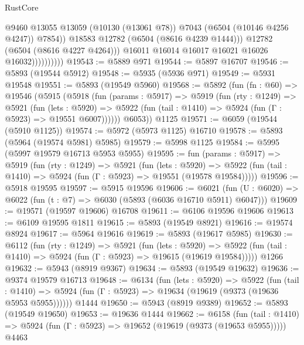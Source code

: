\begin{lexlean}{RustCore}
\begin{coremodule}
                                @9460
                                @13055
                                @13059
                                (@10130 (@13061 @78))
                                @7043
                                (@6504 (@10146 @4256 @4247))
                                @7854))
                            @18583
                            @12782
                            (@6504 (@8616 @4239 @1444)))
                          @12782
                          (@6504 (@8616 @4227 @4264)))
                        @16011
                        @16014
                        @16017
                        @16021
                        @16026
                        @16032))))))))))
@19543 := @5889 @971
@19544 := @5897 @16707
@19546 := @5893 (@19544 @5912)
@19548 := @5935 (@5936 @971)
@19549 := @5931 @19548
@19551 := @5893 (@19549 @5960)
@19568 := @5892
    (fun (fn : @60) =>
    @19546
      (@5915
        (@5918
          (fun (params : @5917) =>
          @5919
            (fun (rty : @1249) =>
            @5921
              (fun (lets : @5920) =>
              @5922 (fun (tail : @1410) => @5924 (fun (Γ : @5923) => @19551 @6007))))))
        @6053))
    @1125
@19571 := @6059 (@19544 (@5910 @1125))
@19574 := @5972 (@5973 @1125) @16710
@19578 := @5893 (@5964 (@19574 @5981) @5985)
@19579 := @5998 @1125
@19584 := @5995 (@5997 @19579 @16713 @5953 @5955)
@19595 := fun (params : @5917) =>
  @5919
    (fun (rty : @1249) =>
    @5921
      (fun (lets : @5920) =>
      @5922 (fun (tail : @1410) => @5924 (fun (Γ : @5923) => @19551 (@19578 @19584)))))
@19596 := @5918 @19595
@19597 := @5915 @19596
@19606 := @6021
    (fun (U : @6020) => @6022 (fun (t : @7) => @6030 (@5893 (@6036 @16710 @5911) @6047)))
@19609 := @19571 (@19597 @19606) @16708
@19611 := @6106 @19596 @19606
@19613 := @6109 @19595 @1811
@19615 := @5893 (@19549 @8921)
@19616 := @19574 @8924
@19617 := @5964 @19616
@19619 := @5893 (@19617 @5985)
@19630 := @6112
    (fun (rty : @1249) =>
    @5921
      (fun (lets : @5920) =>
      @5922 (fun (tail : @1410) => @5924 (fun (Γ : @5923) => @19615 (@19619 @19584)))))
    @1266
@19632 := @5943 (@8919 @9367)
@19634 := @5893 (@19549 @19632)
@19636 := @9374 @19579 @16713
@19648 := @6134
    (fun (lets : @5920) =>
    @5922
      (fun (tail : @1410) =>
      @5924 (fun (Γ : @5923) => @19634 (@19619 (@9373 (@19636 @5953 @5955))))))
    @1444
@19650 := @5943 (@8919 @9389)
@19652 := @5893 (@19549 @19650)
@19653 := @19636 @1444
@19662 := @6158
    (fun (tail : @1410) => @5924 (fun (Γ : @5923) => @19652 (@19619 (@9373 (@19653 @5955)))))
    @4463

\end{coremodule}
\end{lexlean}
